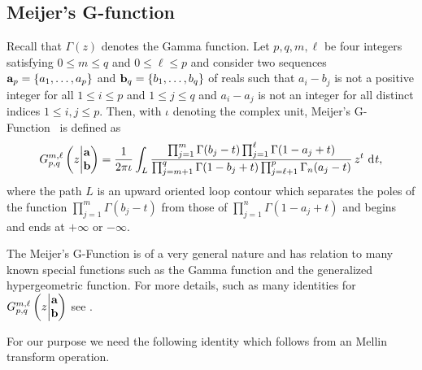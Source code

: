\begin{appendices}

\section{Meijer's G-function}\label{sec:Meijer_G_functions}

Recall that $\Gamma(z)$ denotes the Gamma function. Let $p, q, m, \ell$ be four integers satisfying $0 \le m \le q$ and $0 \le \ell \le p$ and consider two sequences ${\bf a}_p = \{a_1, \dots, a_p\}$ and ${\bf b}_q = \{b_1, \dots, b_q\}$ of reals such that $a_i - b_j$ is not a positive integer for all $1 \le i \le p$ and $1 \le j \le q$ and $a_i - a_j$ is not an integer for all distinct indices $1 \le i, j \le p$. Then, with $\iota$ denoting the complex unit, Meijer's G-Function~\cite{meijer1946g} is defined as
\begin{equation}\label{eq:def_Meijer_G_function}
	\MeijerGnew{m}{\ell}{p}{q}{{\bf a}}{{\bf b}}{z} 
	= \frac{1}{2 \pi \iota} \int_L 
	\frac{\prod_{j = 1}^{m}\Gamma(b_j - t) \prod_{j = 1}^\ell \Gamma(1 - a_j + t)}
	{\prod_{j = m + 1}^{q}\Gamma(1 - b_j + t) \prod_{j = \ell + 1}^p\Gamma_n(a_j-t)} \, z^t \dd t,
\end{equation}
where the path $L$ is an upward oriented loop contour which separates the poles of the function $\prod_{j = 1}^{m}\Gamma(b_j - t)$ from those of $\prod_{j = 1}^n \Gamma(1 - a_j + t)$ and begins and ends at $+\infty$ or $-\infty$.

The Meijer's G-Function is of a very general nature and has relation to many known special functions such as the Gamma function and the generalized hypergeometric function. For more details, such as many identities for $\MeijerGnew{m}{\ell}{p}{q}{{\bf a}}{{\bf b}}{z}$ see \cite{gradshteyn2015table,luke2014mathematical}.

For our purpose we need the following identity which follows from an Mellin transform operation.


\end{appendices}
